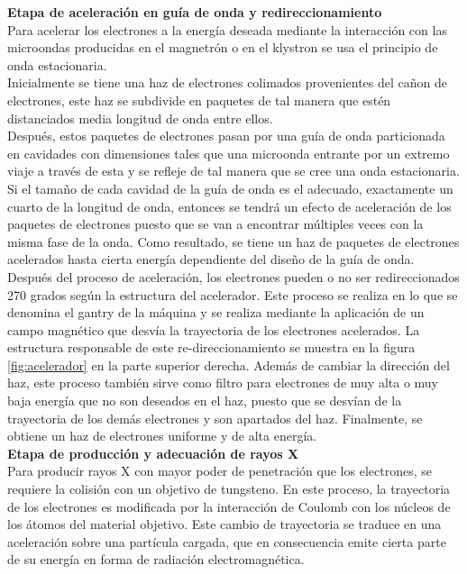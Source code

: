 \textbf{Etapa de aceleración en guía de onda y redireccionamiento}\\

Para acelerar los electrones a la energía deseada mediante la interacción con las microondas producidas en el magnetrón o en el klystron se usa el principio de onda estacionaria. \\

Inicialmente se tiene una haz de electrones colimados provenientes del cañon de electrones, este haz se subdivide en paquetes de tal manera que estén distanciados media longitud de onda entre ellos. \\
 
Después, estos paquetes de electrones pasan por una guía de onda particionada en cavidades con dimensiones tales que una microonda entrante por un extremo viaje a través de esta y se refleje de tal manera que se cree una onda estacionaria.  Si el tamaño de cada cavidad de la guía de onda es el adecuado, exactamente un cuarto de la longitud de onda, entonces se tendrá  un efecto de aceleración de los paquetes de electrones puesto que se van a encontrar múltiples veces con la misma fase de la onda. Como resultado, se tiene un haz de paquetes de electrones acelerados hasta cierta energía dependiente del diseño de la guía de onda.\\

Después del proceso de aceleración, los electrones pueden o no ser redireccionados 270 grados según la estructura del acelerador. Este proceso se realiza en lo que se denomina el gantry de la máquina y se realiza mediante la aplicación de un campo magnético que desvía la trayectoria de los electrones acelerados. La estructura responsable de este re-direccionamiento se muestra en la figura \ref{fig:acelerador} en la parte superior derecha. Además de cambiar la dirección del haz, este proceso también sirve como filtro para electrones de muy alta o muy baja  energía que no son deseados en el haz, puesto que se desvían de la trayectoria de los demás electrones y son apartados del haz. Finalmente, se obtiene un haz de electrones uniforme y de alta energía. \\ 

\textbf{Etapa de producción y adecuación de rayos X}\\

Para producir rayos X con mayor poder de penetración que los electrones, se requiere la colisión con un objetivo de tungsteno. En este proceso, la trayectoria de los electrones es modificada por la interacción de Coulomb con los núcleos de los átomos del material objetivo. Este cambio de trayectoria se traduce en una aceleración sobre una partícula cargada, que en consecuencia emite cierta parte de su energía en forma de radiación electromagnética. \\

